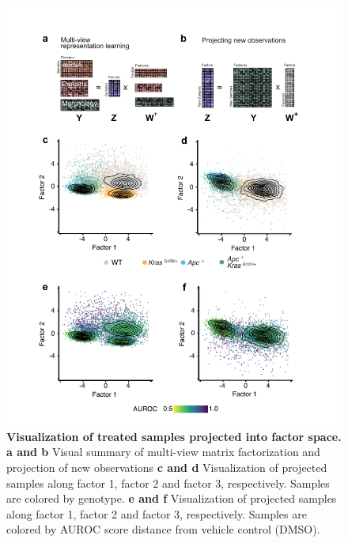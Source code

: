 \begin{flushleft}
\begin{figure}[h]
\centering
\includegraphics[scale=0.75,
                keepaspectratio]{figures/adenomaprofiling/pdf/fig_5_0.pdf}
\caption[Visualization of treated samples projected into factor space]{\textbf{Visualization of treated samples projected into factor space. a and b} Visual summary of multi-view matrix factorization and projection of new observations \textbf{c and d} Visualization of projected samples along factor 1, factor 2 and factor 3, respectively. Samples are colored by genotype. \textbf{e and f} Visualization of projected samples along factor 1, factor 2 and factor 3, respectively. Samples are colored by AUROC score distance from vehicle control (DMSO).}
\label{fig_500}
\end{figure}
\bigbreak



\end{flushleft}
